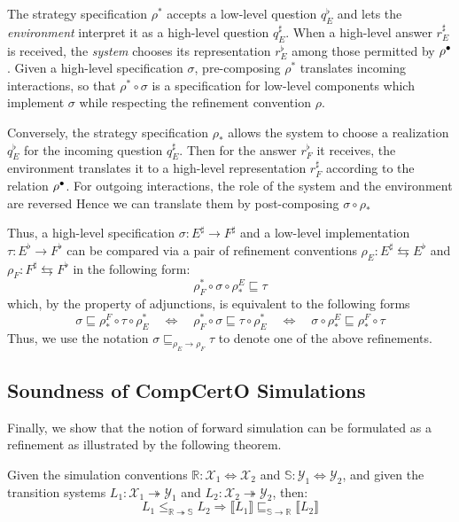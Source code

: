 \documentclass[acmsmall,review,anonymous]{acmart}\settopmatter{printfolios=true,printccs=false,printacmref=false}
\begin{document}
The strategy specification $\rho^*$
accepts a low-level question $q_E^\flat$ %
and lets the \emph{environment} interpret it as
a high-level question $q_E^\sharp$. %
When a high-level answer $r_E^\sharp$ is received, %
the \emph{system} chooses
its representation $r_E^\flat$ %
among those permitted by $\rho^\bullet$.
Given a high-level specification $\sigma$,
pre-composing $\rho^*$ translates incoming interactions,
so that $\rho^* \circ \sigma$
is a specification for low-level components
which implement $\sigma$
while respecting the refinement convention $\rho$.

Conversely,
the strategy specification $\rho_*$
allows the system to choose
a realization $q_E^\flat$
for the incoming question $q_E^\sharp$.
Then for the answer $r_F^\flat$ it receives,
the environment translates it
to a high-level representation $r_F^\sharp$
according to the relation $\rho^\bullet$.
For outgoing interactions,
the role of the system and the environment are reversed
Hence we can translate them
by post-composing $\sigma \circ \rho_*$

Thus, a high-level specification
$\sigma: E^\sharp \rightarrow F^\sharp$
and a low-level implementation
$\tau: E^\flat \rightarrow F^\flat$
can be compared
via a pair of refinement conventions
$\rho_E: E^\sharp \leftrightarrows E^\flat$
and $\rho_F: F^\sharp \leftrightarrows F^\flat$
in the following form:
\[
  \rho_F^* \circ \sigma \circ \rho_*^E \sqsubseteq \tau
\]
which, by the property of adjunctions,
is equivalent to the following forms
\[
  \sigma \sqsubseteq \rho_*^F \circ \tau \circ \rho^*_E
  \quad \Leftrightarrow \quad
  \rho_F^* \circ \sigma \sqsubseteq \tau \circ \rho^*_E
  \quad \Leftrightarrow \quad
  \sigma \circ \rho_*^E \sqsubseteq \rho_*^F \circ \tau
\]
Thus, we use the notation
$\sigma \sqsubseteq_{\rho_E \rightarrow \rho_F} \tau$
to denote one of the above refinements.


\subsection{Soundness of CompCertO Simulations} %

Finally, we show that the notion of forward simulation can be formulated as a
refinement as illustrated by the following theorem.
\begin{theorem}
  Given the simulation conventions $\mathbb{R} : \mathcal{X}_1 \Leftrightarrow \mathcal{X}_2$ and
  $\mathbb{S} : \mathcal{Y}_1 \Leftrightarrow \mathcal{Y}_2$, and given the transition systems
  $L_1: \mathcal{X}_1 \twoheadrightarrow \mathcal{Y}_1$ and
  $L_2: \mathcal{X}_2 \twoheadrightarrow \mathcal{Y}_2$, then:
  \[
    L_1 \le_{\mathbb{R} \twoheadrightarrow \mathbb{S}} L_2 \Rightarrow
    \llbracket L_1 \rrbracket
    \sqsubseteq_{\mathbb{S} \rightarrow \mathbb{R}}
    \llbracket L_2 \rrbracket
  \]
\end{theorem}
\end{document}

